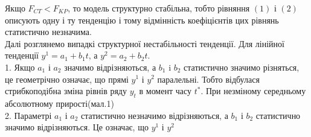 \documentclass[a4paper,12pt]{article}
\begin{document}
Якщо $F_{CT}<F_{KP}$, то модель структурно стабільна, тобто рівняння $(1)$ і $(2)$ описують одну і ту тенденцію і тому відмінність коефіцієнтів цих рівнянь статистично незначима.\\
Далі розглянемо випадкі структурної нестабільності тенденції. Для лінійної тенденції  $y^1=a_1+b_1t $, а $ y^2=a_2+b_2t $.\\
1. Якщо $a_1$ і $a_2$ значимо відрізняються, а $b_1$ i $b_2$ статистично значимо різняться, це геометрічно означає, що прямі $y^1$ і $y^2$ паралельні. Тобто відбулася стрибкоподібна зміна рівнів ряду $y_t$ в момент часу $t^*$. При незміному середньому абсолютному прирості(мал.1)\\
2. Параметрі $a_1$ і $a_2$ статистично незначимо відрізняються, а $b_1$ і $b_2$ статистично значимо відрізняються. Це означає, що $y^1$ і $y^2$
\end{document}
